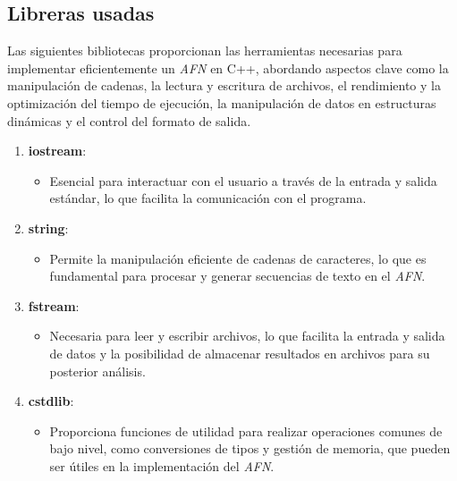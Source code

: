 \documentclass{article}
\begin{document}
    \subsection[Librerias]{Libreras usadas}
        Las siguientes bibliotecas proporcionan las herramientas necesarias para implementar eficientemente un \textit{AFN} en C++,
        abordando aspectos clave como la manipulación de cadenas, la lectura y escritura de archivos, el rendimiento y la optimización
        del tiempo de ejecución, la manipulación de datos en estructuras dinámicas y el control del formato de salida.


        \begin{enumerate}
            \item \textbf{iostream}:
            \begin{itemize}
                \item Esencial para interactuar con el usuario a través de la entrada y salida estándar, lo que facilita la
                comunicación con el programa.
            \end{itemize}

            \item \textbf{string}:
            \begin{itemize}
                \item Permite la manipulación eficiente de cadenas de caracteres, lo que es fundamental para procesar y generar
                secuencias de texto en el \textit{AFN}.
            \end{itemize}

            \item \textbf{fstream}:
            \begin{itemize}
                \item Necesaria para leer y escribir archivos, lo que facilita la entrada y salida de datos y la posibilidad de
                almacenar resultados en archivos para su posterior análisis.
            \end{itemize}

            \item \textbf{cstdlib}:
            \begin{itemize}
                \item Proporciona funciones de utilidad para realizar operaciones comunes de bajo nivel, como conversiones de
                tipos y gestión de memoria, que pueden ser útiles en la implementación del \textit{AFN}.
            \end{itemize}


\end{enumerate}
\end{document}
